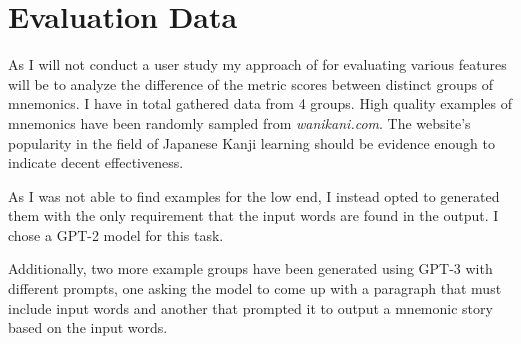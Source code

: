 \section{Evaluation Data} \label{sec:body_evaluation_data}

As I will not conduct a user study my approach of for evaluating various features will be to analyze the difference of the metric scores between distinct groups of mnemonics. I have in total gathered data from 4 groups. High quality examples of mnemonics have been randomly sampled from  \emph{wanikani.com}. The website's popularity in the field of Japanese Kanji learning should be evidence enough to indicate decent effectiveness.

As I was not able to find examples for the low end, I instead opted to generated them with the only requirement that the input words are found in the output. I chose a GPT-2 model for this task.

Additionally, two more example groups have been generated using GPT-3 with different prompts, one asking the model to come up with a paragraph that must include input words and another that prompted it to output a mnemonic story based on the input words.

